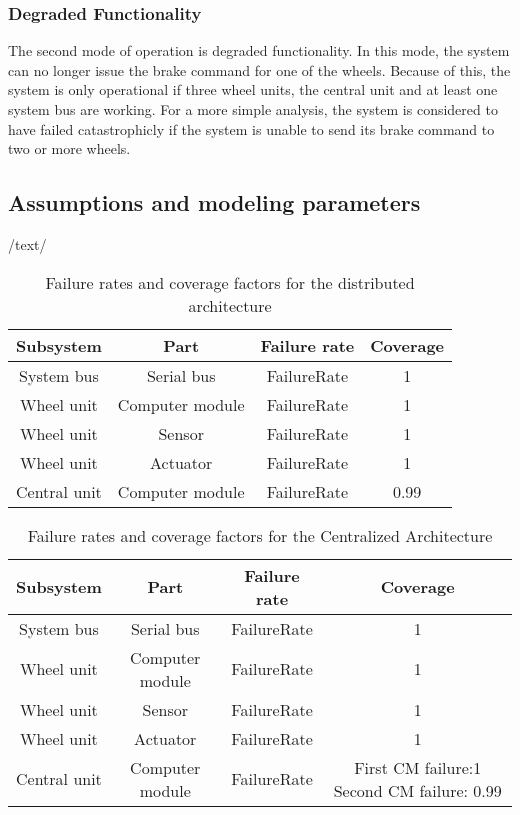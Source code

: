 \subsubsection{Degraded Functionality}
The second mode of operation is degraded functionality. In this mode, the system can no longer issue the brake command for one of the wheels. Because of this, the system is only 
operational if three wheel units, the central unit and at least one system bus are working. For a more simple analysis, the system is considered to have failed catastrophicly
if the system is unable to send its brake command to two or more wheels.
\subsection{Assumptions and modeling parameters}
/text/
\begin{table}[h]
\centering
\begin{tabular}{| c | c | c | c |}
\hline 
Subsystem & Part & Failure rate & Coverage\\
\hline
System bus & Serial bus& FailureRate & 1\\
\hline
Wheel unit & Computer module & FailureRate & 1\\
\hline
Wheel unit & Sensor & FailureRate & 1\\
\hline
Wheel unit & Actuator & FailureRate & 1\\
\hline
Central unit & Computer module & FailureRate & 0.99\\
\hline
\end{tabular}
\caption{Failure rates and coverage factors for the distributed architecture}
\label{tab:Put a Lable}
\end{table}
\begin{table}[h]
\centering
\begin{tabular}{| c | c | c | c |}
\hline 
Subsystem & Part & Failure rate & Coverage\\
\hline
System bus & Serial bus& FailureRate & 1\\
\hline
Wheel unit & Computer module & FailureRate & 1\\
\hline
Wheel unit & Sensor & FailureRate & 1\\
\hline
Wheel unit & Actuator & FailureRate & 1\\
\hline
Central unit & Computer module & FailureRate & First CM failure:1 Second CM failure: 0.99\\
\hline
\end{tabular}
\caption{Failure rates and coverage factors for the Centralized Architecture}
\label{tab:Put a Lable}
\end{table}

